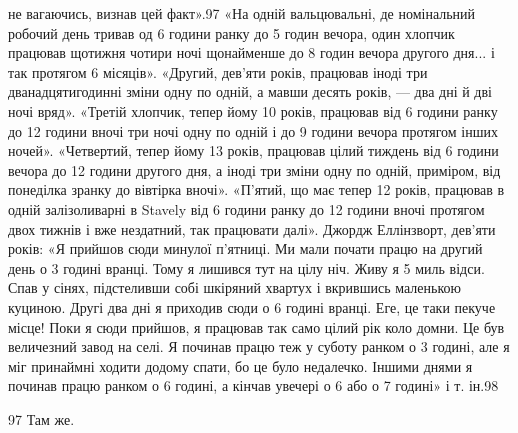 не вагаючись, визнав цей факт».97 «На одній вальцювальні, де
номінальний робочий день тривав од 6 години ранку до 5  годин
вечора, один хлопчик працював щотижня чотири ночі щонайменше
до 8 годин вечора другого дня... і так протягом
6 місяців». «Другий, дев’яти років, працював іноді три дванадцятигодинні
зміни одну по одній, а мавши десять років, — два дні й
дві ночі вряд». «Третій хлопчик, тепер йому 10 років, працював
від 6 години ранку до 12 години вночі три ночі одну по одній і
до 9 години вечора протягом інших ночей». «Четвертий, тепер
йому 13 років, працював цілий тиждень від 6 години вечора до
12 години другого дня, а іноді три зміни одну по одній, приміром,
від понеділка зранку до вівтірка вночі». «П’ятий, що має тепер
12 років, працював в одній залізоливарні в Stavely від 6 години
ранку до 12 години вночі протягом двох тижнів і вже нездатний,
так працювати далі». Джордж Еллінзворт, дев’яти років: «Я прийшов
сюди минулої п’ятниці. Ми мали почати працю на другий
день о 3 годині вранці. Тому я лишився тут на цілу ніч. Живу я
5 миль відси. Спав у сінях, підстеливши собі шкіряний хвартух
і вкрившись маленькою куциною. Другі два дні я приходив сюди
о 6 годині вранці. Еге, це таки пекуче місце! Поки я сюди прийшов,
я працював так само цілий рік коло домни. Це був величезний
завод на селі. Я починав працю теж у суботу ранком о 3 годині, але я міг принаймні ходити додому
спати, бо це було
недалечко. Іншими днями я починав працю ранком о 6 годині, а
кінчав увечері о 6 або о 7 годині» і т. ін.98

97 Там же.

